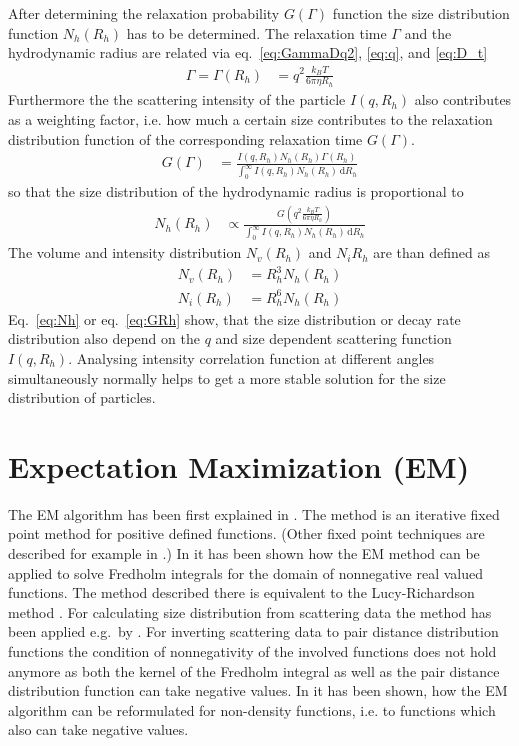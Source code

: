After determining the relaxation probability $G(\Gamma)$ function the size distribution function $N_h(R_h)$ has to be determined. The relaxation time $\Gamma$ and the hydrodynamic radius are related via eq.\ \ref{eq:GammaDq2}, \ref{eq:q}, and \ref{eq:D_t}
\begin{align}
\Gamma = \Gamma(R_h)&= q^2 \frac{k_BT}{6\pi\eta R_h}
\end{align}
Furthermore the the scattering intensity of the particle $I(q,R_h)$ also contributes as a weighting factor, i.e. how much a certain size contributes to the relaxation distribution function of the corresponding relaxation time $G(\Gamma)$.
\begin{align}
\label{eq:GRh}
G(\Gamma) &= \frac{I(q,R_h) N_h(R_h) \Gamma(R_h)} {\int_0^\infty I(q,R_h) N_h(R_h) \, \mathrm{d}R_h}
\end{align}
so that the size distribution of the hydrodynamic radius is proportional to
\begin{align}
\label{eq:Nh}
N_h(R_h) &\propto  \frac{G\left(q^2 \frac{k_BT}{6\pi\eta R_h}\right)}{\int_0^\infty I(q,R_h) N_h(R_h) \, \mathrm{d}R_h}
\end{align}
The volume and intensity distribution $N_v(R_h)$ and $N_i{R_h}$ are than defined as
\begin{align}
N_v(R_h) &= R_h^3 N_h(R_h) \\
N_i(R_h) &= R_h^6 N_h(R_h)
\end{align}
Eq.\ \ref{eq:Nh} or eq.\ \ref{eq:GRh} show, that the size distribution or decay rate distribution also depend on the $q$ and size dependent scattering function $I(q,R_h)$. Analysing intensity correlation function at different angles simultaneously normally helps to get a more stable solution for the size distribution of particles.

\section{Expectation Maximization (EM)}
The EM algorithm has been first explained in \cite{Dempster1977}. The method is an iterative fixed point method for positive defined functions. (Other fixed point techniques are described for example in \cite{Hanke2000}.) In \cite{Vardi1993} it has been shown how the EM method can be applied to solve Fredholm integrals for the domain of nonnegative real valued functions. The method described there is equivalent to the Lucy\hyp{}Richardson method \cite{Richardson1972,Lucy1974}. For calculating size distribution from scattering data the method has been applied e.g.\ by \cite{Yang2013,Benvenuto2016,Benvenuto2017,Bakry2019}. For inverting scattering data to pair distance distribution functions the condition of nonnegativity of the involved functions does not hold anymore as both the kernel of the Fredholm integral as well as the pair distance distribution function can take negative values. In \cite{Chae2018} it has been shown, how the EM algorithm can be reformulated for non-density functions, i.e. to functions which also can take negative values.


